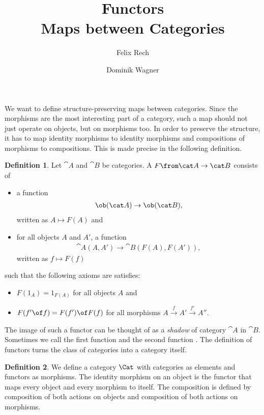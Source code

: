 \documentclass{article}
\theoremstyle{definition}
\newtheorem{definition}{Definition}
\begin{document}
\title{Functors \\ Maps between Categories}
\author{Felix Rech \and Dominik Wagner}
\maketitle

We want to define structure-preserving maps between categories.
Since the morphisms are the most interesting part of a category, such a map should not just operate on objects, but on morphisms too.
In order to preserve the structure, it has to map identity morphisms to identity morphisms and compositions of morphisms to compositions.
This is made precise in the following definition.

\begin{definition}
  Let $\cat A$ and $\cat B$ be categories. A  $F \from \cat A\to\cat B$ consists of
    \begin{itemize}
    \item a function
      \begin{align*}
        \ob(\cat A)\to\ob(\cat B),
      \end{align*}
      written as $A\mapsto F(A)$ and
    \item for all objects $A$ and $A'$, a function
      \begin{align*}
        \cat A(A,A')\to\cat B(F(A),F(A')),
      \end{align*}
      written as $f\mapsto F(f)$
    \end{itemize}
    such that the following axioms are satisfies:
    \begin{itemize}
    \item $F(1_A)=1_{F(A)}$ for all objects $A$ and
    \item $F(f'\of f)=F(f')\of F(f)$ for all morphisms $A\xrightarrow{f}A'\xrightarrow{f'}A''$.
    \end{itemize}
\end{definition}

The image of such a functor can be thought of as a \textit{shadow} of category $\cat{A}$ in $\cat{B}$.
Sometimes we call the first function  and the second function .
The definition of functors turns the class of categories into a category itself.

\begin{definition}
  We define a category $\Cat$ with categories as elements and functors as morphisms.
  The identity morphism on an object is the functor that maps every object and every morphism to itself.
  The composition is defined by composition of both actions on objects and composition of both actions on morphisms.
\end{definition}
\end{document}
